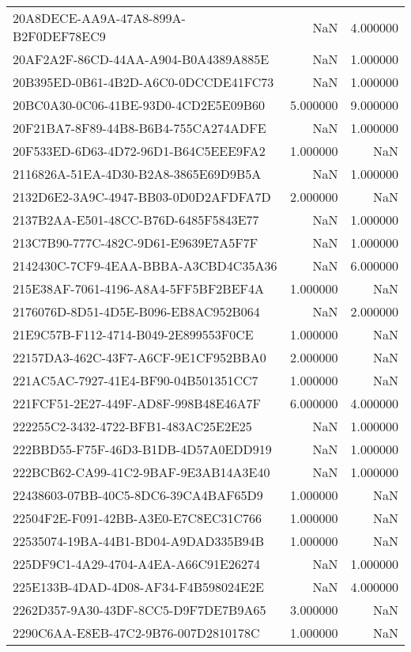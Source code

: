 \begin{tabular}{lrr}
20A8DECE-AA9A-47A8-899A-B2F0DEF78EC9 & NaN & 4.000000 \\
20AF2A2F-86CD-44AA-A904-B0A4389A885E & NaN & 1.000000 \\
20B395ED-0B61-4B2D-A6C0-0DCCDE41FC73 & NaN & 1.000000 \\
20BC0A30-0C06-41BE-93D0-4CD2E5E09B60 & 5.000000 & 9.000000 \\
20F21BA7-8F89-44B8-B6B4-755CA274ADFE & NaN & 1.000000 \\
20F533ED-6D63-4D72-96D1-B64C5EEE9FA2 & 1.000000 & NaN \\
2116826A-51EA-4D30-B2A8-3865E69D9B5A & NaN & 1.000000 \\
2132D6E2-3A9C-4947-BB03-0D0D2AFDFA7D & 2.000000 & NaN \\
2137B2AA-E501-48CC-B76D-6485F5843E77 & NaN & 1.000000 \\
213C7B90-777C-482C-9D61-E9639E7A5F7F & NaN & 1.000000 \\
2142430C-7CF9-4EAA-BBBA-A3CBD4C35A36 & NaN & 6.000000 \\
215E38AF-7061-4196-A8A4-5FF5BF2BEF4A & 1.000000 & NaN \\
2176076D-8D51-4D5E-B096-EB8AC952B064 & NaN & 2.000000 \\
21E9C57B-F112-4714-B049-2E899553F0CE & 1.000000 & NaN \\
22157DA3-462C-43F7-A6CF-9E1CF952BBA0 & 2.000000 & NaN \\
221AC5AC-7927-41E4-BF90-04B501351CC7 & 1.000000 & NaN \\
221FCF51-2E27-449F-AD8F-998B48E46A7F & 6.000000 & 4.000000 \\
222255C2-3432-4722-BFB1-483AC25E2E25 & NaN & 1.000000 \\
222BBD55-F75F-46D3-B1DB-4D57A0EDD919 & NaN & 1.000000 \\
222BCB62-CA99-41C2-9BAF-9E3AB14A3E40 & NaN & 1.000000 \\
22438603-07BB-40C5-8DC6-39CA4BAF65D9 & 1.000000 & NaN \\
22504F2E-F091-42BB-A3E0-E7C8EC31C766 & 1.000000 & NaN \\
22535074-19BA-44B1-BD04-A9DAD335B94B & 1.000000 & NaN \\
225DF9C1-4A29-4704-A4EA-A66C91E26274 & NaN & 1.000000 \\
225E133B-4DAD-4D08-AF34-F4B598024E2E & NaN & 4.000000 \\
2262D357-9A30-43DF-8CC5-D9F7DE7B9A65 & 3.000000 & NaN \\
2290C6AA-E8EB-47C2-9B76-007D2810178C & 1.000000 & NaN \\

\end{tabular}
